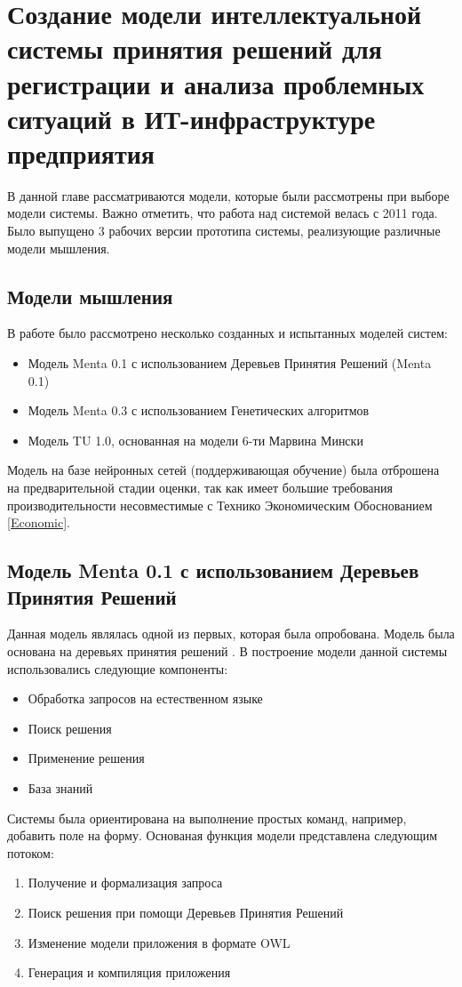 \chapter{Создание модели интеллектуальной системы принятия решений для регистрации и анализа проблемных ситуаций в ИТ-инфраструктуре предприятия} \label{chapt3}

В данной главе рассматриваются модели, которые были рассмотрены при выборе модели системы. Важно отметить, что работа над системой велась с 2011 года. Было выпущено 3 рабочих версии прототипа системы, реализующие различные модели мышления. 
\section{Модели мышления}
В работе было рассмотрено несколько созданных и испытанных моделей систем: \begin{itemize}
	\item Модель Menta 0.1 с использованием Деревьев Принятия Решений (Menta 0.1)
	\item Модель Menta 0.3 с использованием Генетических алгоритмов \cite{ArtificialIntelligence} 
	\item Модель TU 1.0, основанная на модели 6-ти Марвина Мински  \cite{EmotionMachine}
\end{itemize}

Модель на базе нейронных сетей (поддерживающая обучение) была отброшена на предварительной стадии оценки, так как имеет большие требования производительности \cite{NEURAL} несовместимые с Технико Экономическим Обоснованием \ref{Economic}.


\section{Модель Menta 0.1 с использованием Деревьев Принятия Решений} \label{sect3_1}
Данная модель являлась одной из первых, которая была опробована. Модель была основана на деревьях принятия решений \cite{DTREE}. В построение модели данной системы использовались следующие компоненты:
\begin{itemize}
	\item Обработка запросов на естественном языке
	\item Поиск решения
	\item Применение решения
	\item База знаний
\end{itemize}
Системы была ориентирована на выполнение простых команд, например, добавить поле на форму. Основаная функция модели представлена следующим потоком:
\begin{enumerate}
	\item Получение и формализация запроса
	\item Поиск решения при помощи Деревьев Принятия Решений
	\item Изменение модели приложения в формате OWL \cite{OWL}
	\item Генерация и компиляция приложения
\end{enumerate}

